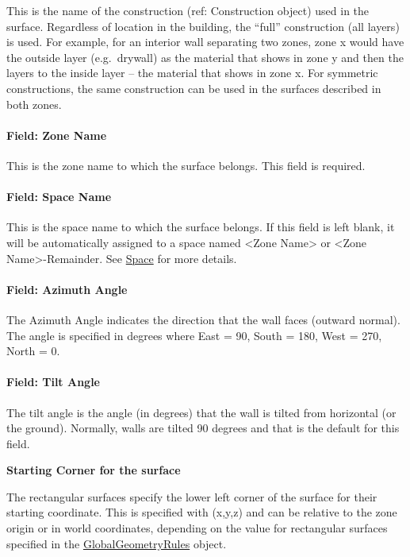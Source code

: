 This is the name of the construction (ref: Construction object) used in the surface. Regardless of location in the building, the ``full'' construction (all layers) is used. For example, for an interior wall separating two zones, zone x would have the outside layer (e.g.~drywall) as the material that shows in zone y and then the layers to the inside layer -- the material that shows in zone x. For symmetric constructions, the same construction can be used in the surfaces described in both zones.

\paragraph{Field: Zone Name}\label{field-zone-name-012}

This is the zone name to which the surface belongs. This field is required.

\paragraph{Field: Space Name}\label{field-space-name-012}

This is the space name to which the surface belongs. If this field is left blank, it will be automatically assigned to a space named <Zone Name> or <Zone Name>-Remainder. See \hyperref[space]{Space} for more details.

\paragraph{Field: Azimuth Angle}

The Azimuth Angle indicates the direction that the wall faces (outward normal). The angle is specified in degrees where East = 90, South = 180, West = 270, North = 0.

\paragraph{Field: Tilt Angle}

The tilt angle is the angle (in degrees) that the wall is tilted from horizontal (or the ground). Normally, walls are tilted 90 degrees and that is the default for this field.

\begin{callout}
\textbf{Starting Corner for the surface}

The rectangular surfaces specify the lower left corner of the surface for their starting coordinate. This is specified with (x,y,z) and can be relative to the zone origin or in world coordinates, depending on the value for rectangular surfaces specified in the \hyperref[globalgeometryrules]{GlobalGeometryRules} object.
\end{callout}

